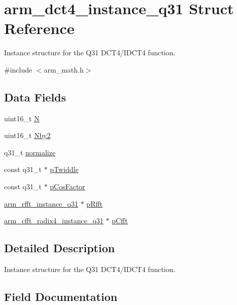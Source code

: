 \hypertarget{structarm__dct4__instance__q31}{}\section{arm\+\_\+dct4\+\_\+instance\+\_\+q31 Struct Reference}
\label{structarm__dct4__instance__q31}


Instance structure for the Q31 D\+C\+T4/\+I\+D\+C\+T4 function.  




{\ttfamily \#include $<$arm\+\_\+math.\+h$>$}

\subsection*{Data Fields}
\begin{DoxyCompactItemize}
\item 
uint16\+\_\+t \mbox{\hyperlink{structarm__dct4__instance__q31_a37d49571fe35012087153c093705cd11}{N}}
\item 
uint16\+\_\+t \mbox{\hyperlink{structarm__dct4__instance__q31_afa64b1618089e35c2b55cff71cb29715}{Nby2}}
\item 
q31\+\_\+t \mbox{\hyperlink{structarm__dct4__instance__q31_a3a2f571658a202a38fa508098001b47c}{normalize}}
\item 
const q31\+\_\+t $\ast$ \mbox{\hyperlink{structarm__dct4__instance__q31_a9760c603af5d85652496dbffd63a8a2e}{p\+Twiddle}}
\item 
const q31\+\_\+t $\ast$ \mbox{\hyperlink{structarm__dct4__instance__q31_aa974df00a55867c29876179e57f2ac7f}{p\+Cos\+Factor}}
\item 
\mbox{\hyperlink{structarm__rfft__instance__q31}{arm\+\_\+rfft\+\_\+instance\+\_\+q31}} $\ast$ \mbox{\hyperlink{structarm__dct4__instance__q31_a16c74f8496e1691e62da3c57e0c676eb}{p\+Rfft}}
\item 
\mbox{\hyperlink{structarm__cfft__radix4__instance__q31}{arm\+\_\+cfft\+\_\+radix4\+\_\+instance\+\_\+q31}} $\ast$ \mbox{\hyperlink{structarm__dct4__instance__q31_a0b1f4a05c1824bab3b9bd837a260232a}{p\+Cfft}}
\end{DoxyCompactItemize}


\subsection{Detailed Description}
Instance structure for the Q31 D\+C\+T4/\+I\+D\+C\+T4 function. 

\subsection{Field Documentation}
\mbox{\label{structarm__dct4__instance__q31_a37d49571fe35012087153c093705cd11}} 
